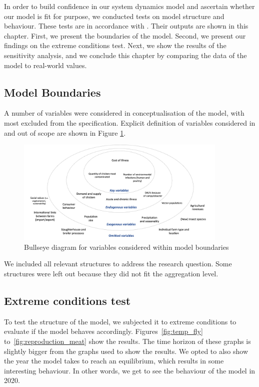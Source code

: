 In order to build confidence in our system dynamics model and ascertain whether our model is fit for purpose, we conducted tests on model structure and behaviour. These tests are in accordance with \cite{forrester_tests_1980}. Their outputs are shown in this chapter. First, we present the boundaries of the model. Second, we present our findings on the extreme conditions test. Next, we show the results of the sensitivity analysis, and we conclude this chapter by comparing the data of the model to real-world values.

\subsection{Model Boundaries}
A number of variables were considered in conceptualisation of the model, with most excluded from the specification. Explicit definition of variables considered in and out of scope are shown in  Figure \ref{fig:bullseye}.

\begin{figure}[h]
\centering
\includegraphics[width=0.90\textwidth]{images/bullseye.png}
\caption{Bullseye diagram for variables considered within model boundaries}
\label{fig:bullseye}
\end{figure}

We included all relevant structures to address the research question. Some structures were left out because they did not fit the aggregation level.

\subsection{Extreme conditions test}
\label{s:extreme_conditions}

To test the structure of the model, we subjected it to extreme conditions to evaluate if the model behaves accordingly. Figures~\ref{fig:temp_fly} to~\ref{fig:reproduction_meat} show the results. The time horizon of these graphs is slightly bigger from the graphs used to show the results. We opted to also show the year the model takes to reach an equilibrium, which results in some interesting behaviour. In other words, we get to see the behaviour of the model in 2020.

